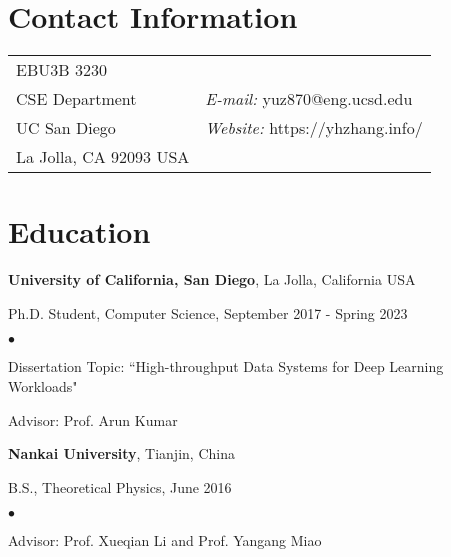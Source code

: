 \documentclass[margin,line]{res}
\newenvironment{list1}{
 \begin{list}{\ding{113}}{%
   \setlength{\itemsep}{0in}
   \setlength{\parsep}{0in} \setlength{\parskip}{0in}
   \setlength{\topsep}{0in} \setlength{\partopsep}{0in} 
   \setlength{\leftmargin}{0.17in}}}{\end{list}}
\newenvironment{list2}{
 \begin{list}{$\bullet$}{%
   \setlength{\itemsep}{0in}
   \setlength{\parsep}{0in} \setlength{\parskip}{0in}
   \setlength{\topsep}{0in} \setlength{\partopsep}{0in} 
   \setlength{\leftmargin}{0.2in}}}{\end{list}}
\begin{document}
\sloppy


\begin{resume}
\section{\sc Contact Information}
\vspace{.05in}
\begin{tabular}{@{}p{2in}p{4in}}
EBU3B 3230       &  \\       
CSE Department  & {\it E-mail:} yuz870@eng.ucsd.edu\\
UC San Diego & {\it Website:} https://yhzhang.info/ \\    
La Jolla, CA 92093 USA & \\   
\end{tabular}

\section{\sc Education}
{\bf University of California, San Diego}, La Jolla, California USA\\
\vspace*{-.1in}
\begin{list1}
\item[] Ph.D. Student, Computer Science, September 2017 - Spring 2023
\begin{list2}
\vspace*{.05in}
\item Dissertation Topic: ``High-throughput Data Systems for Deep Learning Workloads"
\item Advisor: Prof. Arun Kumar
\end{list2}
\end{list1}

{\bf Nankai University}, Tianjin, China\\
\vspace*{-.1in}
\begin{list1}
\item[] B.S., Theoretical Physics, June 2016
\begin{list2}
\item Advisor: Prof. Xueqian Li and Prof. Yangang Miao
\end{list2}
\end{list1}



\end{resume}
\end{document}
